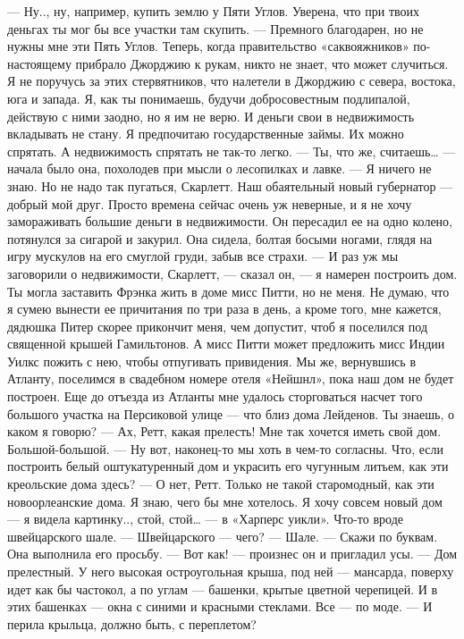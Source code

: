 — Ну.., ну, например, купить землю у Пяти Углов. Уверена, что при твоих деньгах ты мог бы все участки там скупить.
— Премного благодарен, но не нужны мне эти Пять Углов. Теперь, когда правительство «саквояжников» по-настоящему прибрало Джорджию к рукам, никто не знает, что может случиться. Я не поручусь за этих стервятников, что налетели в Джорджию с севера, востока, юга и запада. Я, как ты понимаешь, будучи добросовестным подлипалой, действую с ними заодно, но я им не верю. И деньги свои в недвижимость вкладывать не стану. Я предпочитаю государственные займы. Их можно спрятать. А недвижимость спрятать не так-то легко.
— Ты, что же, считаешь… — начала было она, похолодев при мысли о лесопилках и лавке.
— Я ничего не знаю. Но не надо так пугаться, Скарлетт. Наш обаятельный новый губернатор — добрый мой друг. Просто времена сейчас очень уж неверные, и я не хочу замораживать большие деньги в недвижимости.
Он пересадил ее на одно колено, потянулся за сигарой и закурил. Она сидела, болтая босыми ногами, глядя на игру мускулов на его смуглой груди, забыв все страхи.
— И раз уж мы заговорили о недвижимости, Скарлетт, — сказал он, — я намерен построить дом. Ты могла заставить Фрэнка жить в доме мисс Питти, но не меня. Не думаю, что я сумею вынести ее причитания по три раза в день, а кроме того, мне кажется, дядюшка Питер скорее прикончит меня, чем допустит, чтоб я поселился под священной крышей Гамильтонов. А мисс Питти может предложить мисс Индии Уилкс пожить с нею, чтобы отпугивать привидения. Мы же, вернувшись в Атланту, поселимся в свадебном номере отеля «Нейшнл», пока наш дом не будет построен. Еще до отъезда из Атланты мне удалось сторговаться насчет того большого участка на Персиковой улице — что близ дома Лейденов. Ты знаешь, о каком я говорю?
— Ах, Ретт, какая прелесть! Мне так хочется иметь свой дом. Большой-большой.
— Ну вот, наконец-то мы хоть в чем-то согласны. Что, если построить белый оштукатуренный дом и украсить его чугунным литьем, как эти креольские дома здесь?
— О нет, Ретт. Только не такой старомодный, как эти новоорлеанские дома. Я знаю, чего бы мне хотелось. Я хочу совсем новый дом — я видела картинку.., стой, стой… — в «Харперс уикли». Что-то вроде швейцарского шале.
— Швейцарского — чего?
— Шале.
— Скажи по буквам.
Она выполнила его просьбу.
— Вот как! — произнес он и пригладил усы.
— Дом прелестный. У него высокая остроугольная крыша, под ней — мансарда, поверху идет как бы частокол, а по углам — башенки, крытые цветной черепицей. И в этих башенках — окна с синими и красными стеклами. Все — по моде.
— И перила крыльца, должно быть, с переплетом?
